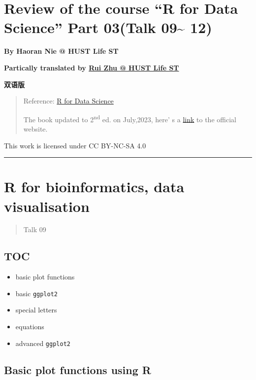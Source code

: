 \documentclass[
]{article}
\author{}
\date{}
\begin{document}
\hypertarget{review-of-the-course-r-for-data-science-part-03talk-09-12}{%
\section{Review of the course ``R for Data Science'' Part 03(Talk
09\textasciitilde{}
12)}\label{review-of-the-course-r-for-data-science-part-03talk-09-12}}

\textbf{By Haoran Nie @ HUST Life ST}

\textbf{Partically translated by
\href{https://github.com/1508324011}{Rui Zhu @ HUST Life ST}}

\textbf{双语版}

\begin{quote}
Reference: \href{https://r4ds.had.co.nz}{R for Data Science}

The book updated to 2\textsuperscript{nd} ed. on July,2023, here' s a
\href{https://r4ds.hadley.nz}{link} to the official website.
\end{quote}

This work is licensed under CC BY-NC-SA 4.0

\begin{center}\rule{0.5\linewidth}{0.5pt}\end{center}

\hypertarget{r-for-bioinformatics-data-visualisation}{%
\section{R for bioinformatics, data
visualisation}\label{r-for-bioinformatics-data-visualisation}}

\begin{quote}
Talk 09
\end{quote}

\hypertarget{toc}{%
\subsection{TOC}\label{toc}}

\begin{itemize}
\item
  basic plot functions
\item
  basic \texttt{ggplot2}
\item
  special letters
\item
  equations
\item
  advanced \texttt{ggplot2}
\end{itemize}

\hypertarget{basic-plot-functions-using-r}{%
\subsection{Basic plot functions using
R}\label{basic-plot-functions-using-r}}
\end{document}
